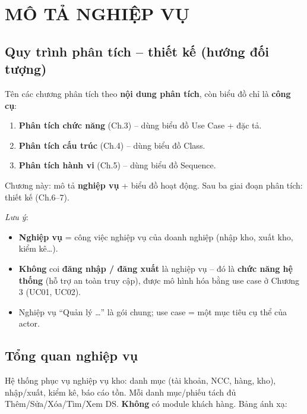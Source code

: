 \chapter{MÔ TẢ NGHIỆP VỤ}

\section{Quy trình phân tích -- thiết kế (hướng đối tượng)}

Tên các chương phân tích theo \textbf{nội dung phân tích}, còn biểu đồ chỉ là \textbf{công cụ}:

\begin{enumerate}[leftmargin=1.5cm]
    \item \textbf{Phân tích chức năng} (Ch.3) -- dùng biểu đồ Use Case + đặc tả.
    \item \textbf{Phân tích cấu trúc} (Ch.4) -- dùng biểu đồ Class.
    \item \textbf{Phân tích hành vi} (Ch.5) -- dùng biểu đồ Sequence.
\end{enumerate}

Chương này: mô tả \textbf{nghiệp vụ} + biểu đồ hoạt động. Sau ba giai đoạn phân tích: thiết kế (Ch.6--7).

\textit{Lưu ý}:
\begin{itemize}[leftmargin=1.5cm]
    \item \textbf{Nghiệp vụ} = công việc nghiệp vụ của doanh nghiệp (nhập kho, xuất kho, kiểm kê\ldots).
    \item \textbf{Không} coi \textbf{đăng nhập / đăng xuất} là nghiệp vụ -- đó là \textbf{chức năng hệ thống} (hỗ trợ an toàn truy cập), được mô hình hóa bằng use case ở Chương 3 (UC01, UC02).
    \item Nghiệp vụ ``Quản lý \ldots'' là gói chung; use case = một mục tiêu cụ thể của actor.
\end{itemize}

\section{Tổng quan nghiệp vụ}

Hệ thống phục vụ nghiệp vụ kho: danh mục (tài khoản, NCC, hàng, kho), nhập/xuất, kiểm kê, báo cáo tồn. Mỗi danh mục/phiếu tách đủ Thêm/Sửa/Xóa/Tìm/Xem DS. \textbf{Không} có module khách hàng. Bảng ánh xạ:


